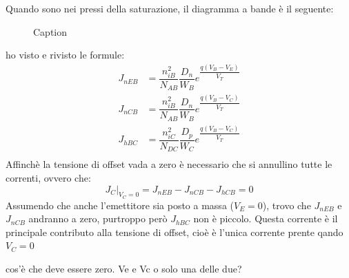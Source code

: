 Quando sono nei pressi della saturazione, il diagramma a bande è il seguente:
\begin{figure}[hbt!]
    \centering
    \caption{Caption}%
    \label{fig:enter-label}
\end{figure}

ho visto e rivisto le formule:
\begin{align}
    J_{nEB} &= \dfrac{n_{iB}^2}{N_{AB}} \dfrac{D_n}{W_B} e^{\dfrac{q(V_B - V_E)}{V_T}}\\
    J_{nCB} &= \dfrac{n_{iB}^2}{N_{AB}} \dfrac{D_n}{W_B} e^{\dfrac{q(V_B - V_C)}{V_T}}\\
    J_{hBC} &= \dfrac{n_{iC}^2}{N_{DC}} \dfrac{D_p}{W_C} e^{\dfrac{q(V_B - V_C)}{V_T}}\\
\end{align}
Affinchè la tensione di offset vada a zero è necessario che si annullino tutte le correnti, ovvero che:
\begin{equation}
    \left. J_C \right |_{V_C=0} = J_{nEB} - J_{nCB}- J_{hCB} = 0
\end{equation}
%
Assumendo che anche l'emettitore sia posto a massa ($V_E=0$), trovo che $J_{nEB}$ e $J_{nCB}$ andranno a zero, purtroppo però $J_{hBC}$ non è piccolo. Questa corrente è il principale contributo alla tensione di offset, cioè è l'unica corrente prente qando $V_C=0$
\begin{ricevimento}
    cos'è che deve essere zero. Ve e Vc o  solo una delle due?
\end{ricevimento}

